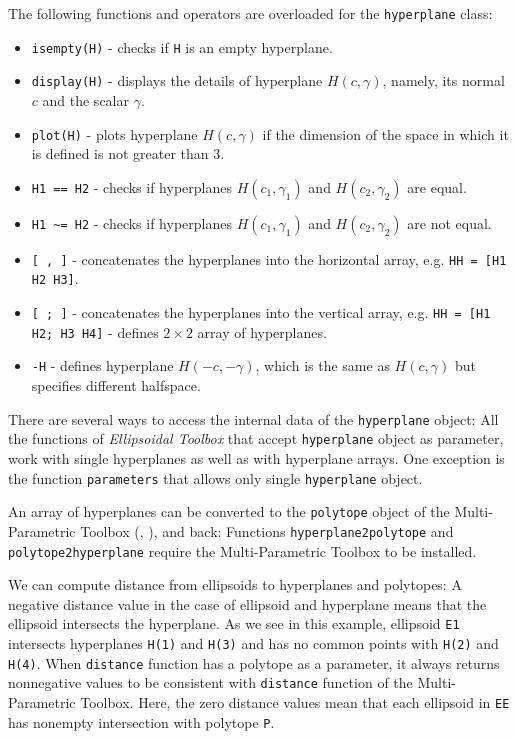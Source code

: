 \documentclass{report}
\begin{document}
The following functions and operators are overloaded for the
{\tt hyperplane} class:
\begin{itemize}
\item {\tt isempty(H)} - checks if {\tt H} is an empty hyperplane.
\item {\tt display(H)} - displays the details of hyperplane $H(c,\gamma)$,
namely, its normal $c$ and the scalar $\gamma$.
\item {\tt plot(H)} - plots hyperplane $H(c,\gamma)$ if the dimension of the
space in which it is defined  is not greater than 3.
\item {\tt H1 == H2} - checks if hyperplanes $H(c_1,\gamma_1)$ and
$H(c_2,\gamma_2)$ are equal.
\item {\tt H1 \~{ }= H2} - checks if hyperplanes $H(c_1,\gamma_1)$ and
$H(c_2,\gamma_2)$ are not equal.
\item {\tt [ , ]} - concatenates the hyperplanes into the horizontal array, e.g.
{\tt HH = [H1 H2 H3]}.
\item {\tt [ ; ]} - concatenates the hyperplanes into the vertical array, e.g.
{\tt HH = [H1 H2; H3 H4]} - defines $2\times 2$ array of hyperplanes.
\item {\tt -H} - defines hyperplane $H(-c,-\gamma)$, which is the same
as $H(c,\gamma)$ but specifies different halfspace.
\end{itemize}
\newpage
There are several ways to access the internal data of the {\tt hyperplane}
object:
All the functions of {\it Ellipsoidal Toolbox} that accept {\tt hyperplane}
object as parameter, work with single hyperplanes as well as with hyperplane
arrays. One exception is the function {\tt parameters} that allows only
single {\tt hyperplane} object.

An array of hyperplanes can be converted to the {\tt polytope} object of the
Multi-Parametric Toolbox (\cite{morari}, \cite{mpt}), and back:
Functions {\tt hyperplane2polytope} and {\tt polytope2hyperplane} require
the Multi-Parametric Toolbox to be installed.

We can compute distance from ellipsoids to hyperplanes and polytopes:
A negative distance value in the case of ellipsoid and hyperplane means that
the ellipsoid intersects the hyperplane. As we see in this example, ellipsoid
{\tt E1} intersects  hyperplanes {\tt H(1)} and {\tt H(3)} and has
no common points with {\tt H(2)} and {\tt H(4)}. When {\tt distance} function
has a polytope as a parameter, it always returns nonnegative values to be
consistent with {\tt distance} function of the Multi-Parametric Toolbox.
Here, the zero distance values mean that each ellipsoid in {\tt EE} has
nonempty intersection with polytope {\tt P}.
\end{document}
